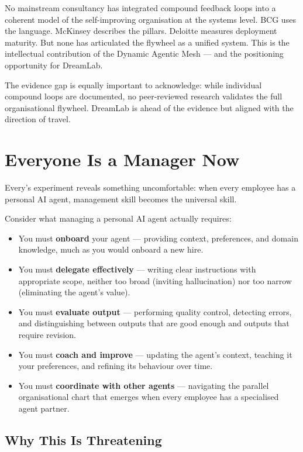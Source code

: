 \begin{keyinsight}[title={The Gap This Fills}]
No mainstream consultancy has integrated compound feedback loops into a coherent model of the self-improving organisation at the systems level. BCG uses the language. McKinsey describes the pillars. Deloitte measures deployment maturity. But none has articulated the flywheel as a unified system. This is the intellectual contribution of the Dynamic Agentic Mesh --- and the positioning opportunity for DreamLab.

The evidence gap is equally important to acknowledge: while individual compound loops are documented, no peer-reviewed research validates the full organisational flywheel. DreamLab is ahead of the evidence but aligned with the direction of travel.
\end{keyinsight}

\section{Everyone Is a Manager Now}

Every's experiment reveals something uncomfortable: when every employee has a personal AI agent, management skill becomes the universal skill.

Consider what managing a personal AI agent actually requires:

\begin{itemize}
  \item You must \textbf{onboard} your agent --- providing context, preferences, and domain knowledge, much as you would onboard a new hire.
  \item You must \textbf{delegate effectively} --- writing clear instructions with appropriate scope, neither too broad (inviting hallucination) nor too narrow (eliminating the agent's value).
  \item You must \textbf{evaluate output} --- performing quality control, detecting errors, and distinguishing between outputs that are good enough and outputs that require revision.
  \item You must \textbf{coach and improve} --- updating the agent's context, teaching it your preferences, and refining its behaviour over time.
  \item You must \textbf{coordinate with other agents} --- navigating the parallel organisational chart that emerges when every employee has a specialised agent partner.
\end{itemize}

\subsection{Why This Is Threatening}

